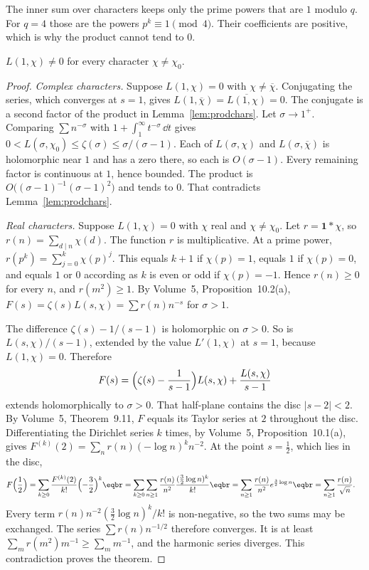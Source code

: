 The inner sum over characters keeps only the prime powers that are $1$ modulo $q$. For $q=4$ those are the powers $p^k\equiv1\pmod4$. Their coefficients are positive, which is why the product cannot tend to $0$.

\begin{theorem}[Dirichlet, 1837]\label{thm:lnonzero}
$L(1,\chi)\ne0$ for every character $\chi\ne\chi_0$.
\end{theorem}
\begin{proof}
\emph{Complex characters.} Suppose $L(1,\chi)=0$ with $\chi\ne\overline\chi$. Conjugating the series, which converges at $s=1$, gives $L(1,\overline\chi)=\overline{L(1,\chi)}=0$. The conjugate is a second factor of the product in Lemma~\ref{lem:prodchars}. Let $\sigma\to1^+$. Comparing $\sum n^{-\sigma}$ with $1+\int_1^\infty t^{-\sigma}\,\dd t$ gives $0<L(\sigma,\chi_0)\le\zeta(\sigma)\le\sigma/(\sigma-1)$. Each of $L(\sigma,\chi)$ and $L(\sigma,\overline\chi)$ is holomorphic near $1$ and has a zero there, so each is $O(\sigma-1)$. Every remaining factor is continuous at $1$, hence bounded. The product is $O\bigl((\sigma-1)^{-1}(\sigma-1)^2\bigr)$ and tends to $0$. That contradicts Lemma~\ref{lem:prodchars}.

\emph{Real characters.} Suppose $L(1,\chi)=0$ with $\chi$ real and $\chi\ne\chi_0$. Let $r=\mathbf1*\chi$, so $r(n)=\sum_{d\mid n}\chi(d)$. The function $r$ is multiplicative. At a prime power, $r(p^k)=\sum_{j=0}^k\chi(p)^j$. This equals $k+1$ if $\chi(p)=1$, equals $1$ if $\chi(p)=0$, and equals $1$ or $0$ according as $k$ is even or odd if $\chi(p)=-1$. Hence $r(n)\ge0$ for every $n$, and $r(m^2)\ge1$. By Volume~5, Proposition~10.2(a), $F(s)=\zeta(s)L(s,\chi)=\sum r(n)n^{-s}$ for $\sigma>1$.

The difference $\zeta(s)-1/(s-1)$ is holomorphic on $\sigma>0$. So is $L(s,\chi)/(s-1)$, extended by the value $L'(1,\chi)$ at $s=1$, because $L(1,\chi)=0$. Therefore
\[
F(s)=\Bigl(\zeta(s)-\frac1{s-1}\Bigr)L(s,\chi)+\frac{L(s,\chi)}{s-1}
\]
extends holomorphically to $\sigma>0$. That half-plane contains the disc $|s-2|<2$. By Volume~5, Theorem~9.11, $F$ equals its Taylor series at $2$ throughout the disc. Differentiating the Dirichlet series $k$ times, by Volume~5, Proposition~10.1(a), gives $F^{(k)}(2)=\sum_n r(n)(-\log n)^k n^{-2}$. At the point $s=\frac12$, which lies in the disc,
\[
\begin{aligned}F\Bigl(\frac12\Bigr)&=\sum_{k\ge0}\frac{F^{(k)}(2)}{k!}\Bigl(-\frac32\Bigr)^k\eqbr=\sum_{k\ge0}\sum_{n\ge1}\frac{r(n)}{n^2}\frac{(\frac32\log n)^k}{k!}\eqbr=\sum_{n\ge1}\frac{r(n)}{n^2}e^{\frac32\log n}\eqbr=\sum_{n\ge1}\frac{r(n)}{\sqrt n}.\end{aligned}
\]
Every term $r(n)n^{-2}(\frac32\log n)^k/k!$ is non-negative, so the two sums may be exchanged. The series $\sum r(n)n^{-1/2}$ therefore converges. It is at least $\sum_m r(m^2)m^{-1}\ge\sum_m m^{-1}$, and the harmonic series diverges. This contradiction proves the theorem.
\end{proof}

